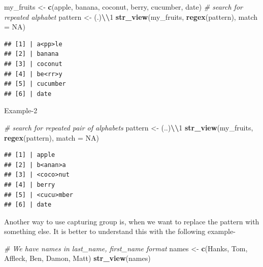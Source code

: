 \documentclass[
]{book}
\newenvironment{Shaded}{\begin{snugshade}}{\end{snugshade}}
\newcommand{\AttributeTok}[1]{\textcolor[rgb]{0.13,0.29,0.53}{#1}}
\newcommand{\CommentTok}[1]{\textcolor[rgb]{0.56,0.35,0.01}{\textit{#1}}}
\newcommand{\ConstantTok}[1]{\textcolor[rgb]{0.56,0.35,0.01}{#1}}
\newcommand{\FunctionTok}[1]{\textcolor[rgb]{0.13,0.29,0.53}{\textbf{#1}}}
\newcommand{\NormalTok}[1]{#1}
\newcommand{\OtherTok}[1]{\textcolor[rgb]{0.56,0.35,0.01}{#1}}
\newcommand{\SpecialCharTok}[1]{\textcolor[rgb]{0.81,0.36,0.00}{\textbf{#1}}}
\newcommand{\StringTok}[1]{\textcolor[rgb]{0.31,0.60,0.02}{#1}}
\begin{document}
\begin{Shaded}
\begin{Highlighting}[]
\NormalTok{my\_fruits }\OtherTok{\textless{}{-}} \FunctionTok{c}\NormalTok{(}\StringTok{\textquotesingle{}apple\textquotesingle{}}\NormalTok{, }\StringTok{\textquotesingle{}banana\textquotesingle{}}\NormalTok{, }\StringTok{\textquotesingle{}coconut\textquotesingle{}}\NormalTok{, }\StringTok{\textquotesingle{}berry\textquotesingle{}}\NormalTok{, }\StringTok{\textquotesingle{}cucumber\textquotesingle{}}\NormalTok{, }\StringTok{\textquotesingle{}date\textquotesingle{}}\NormalTok{)}
\CommentTok{\# search for repeated alphabet}
\NormalTok{pattern }\OtherTok{\textless{}{-}} \StringTok{\textquotesingle{}(.)}\SpecialCharTok{\textbackslash{}\textbackslash{}}\StringTok{1\textquotesingle{}}
\FunctionTok{str\_view}\NormalTok{(my\_fruits, }\FunctionTok{regex}\NormalTok{(pattern), }\AttributeTok{match =} \ConstantTok{NA}\NormalTok{)}
\end{Highlighting}
\end{Shaded}

\begin{verbatim}
## [1] | a<pp>le
## [2] | banana
## [3] | coconut
## [4] | be<rr>y
## [5] | cucumber
## [6] | date
\end{verbatim}

Example-2

\begin{Shaded}
\begin{Highlighting}[]
\CommentTok{\# search for repeated pair of alphabets}
\NormalTok{pattern }\OtherTok{\textless{}{-}} \StringTok{\textquotesingle{}(..)}\SpecialCharTok{\textbackslash{}\textbackslash{}}\StringTok{1\textquotesingle{}}
\FunctionTok{str\_view}\NormalTok{(my\_fruits, }\FunctionTok{regex}\NormalTok{(pattern), }\AttributeTok{match =} \ConstantTok{NA}\NormalTok{)}
\end{Highlighting}
\end{Shaded}

\begin{verbatim}
## [1] | apple
## [2] | b<anan>a
## [3] | <coco>nut
## [4] | berry
## [5] | <cucu>mber
## [6] | date
\end{verbatim}

Another way to use capturing group is, when we want to replace the pattern with something else. It is better to understand this with the following example-

\begin{Shaded}
\begin{Highlighting}[]
\CommentTok{\# We have names in last\_name, first\_name format}
\NormalTok{names }\OtherTok{\textless{}{-}} \FunctionTok{c}\NormalTok{(}\StringTok{\textquotesingle{}Hanks, Tom\textquotesingle{}}\NormalTok{, }\StringTok{\textquotesingle{}Affleck, Ben\textquotesingle{}}\NormalTok{, }\StringTok{\textquotesingle{}Damon, Matt\textquotesingle{}}\NormalTok{)}
\FunctionTok{str\_view}\NormalTok{(names)}
\end{Highlighting}
\end{Shaded}
\end{document}
